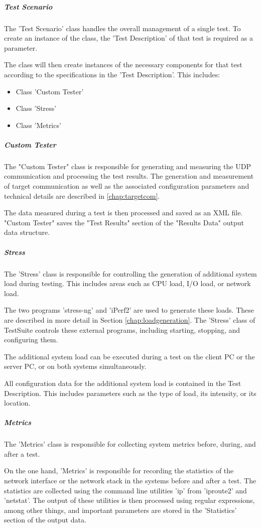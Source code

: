 \subparagraph{Test Scenario}
The 'Test Scenario' class handles the overall management of a single test. To create an instance of the class, the 'Test Description' of that test is required as a parameter.

The class will then create instances of the necessary components for that test according to the specifications in the 'Test Description'. This includes:
\begin{itemize}
	\item Class 'Custom Tester'
	\item Class 'Stress'
	\item Class 'Metrics'
\end{itemize}

\subparagraph{Custom Tester} \label{chap:customtester}
The "Custom Tester" class is responsible for generating and measuring the UDP communication and processing the test results. The generation and measurement of target communication as well as the associated configuration parameters and technical details are described in \ref{chap:targetcom}.

The data measured during a test is then processed and saved as an XML file. "Custom Tester" saves the "Test Results" section of the "Results Data" output data structure.

\subparagraph{Stress}
The 'Stress' class is responsible for controlling the generation of additional system load during testing. This includes areas such as CPU load, I/O load, or network load.

The two programs 'stress-ng' and 'iPerf2' are used to generate these loads. These are described in more detail in Section \ref{chap:loadgeneration}. The 'Stress' class of TestSuite controls these external programs, including starting, stopping, and configuring them.

The additional system load can be executed during a test on the client PC or the server PC, or on both systems simultaneously.

All configuration data for the additional system load is contained in the Test Description. This includes parameters such as the type of load, its intensity, or its location.

\subparagraph{Metrics}
The 'Metrics' class is responsible for collecting system metrics before, during, and after a test.

On the one hand, 'Metrics' is responsible for recording the statistics of the network interface or the network stack in the systems before and after a test. The statistics are collected using the command line utilities 'ip' from 'iproute2' and 'netstat'. The output of these utilities is then processed using regular expressions, among other things, and important parameters are stored in the 'Statistics' section of the output data.

